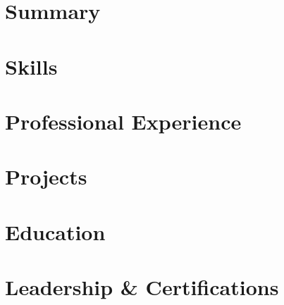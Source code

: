 \documentclass[letter,10pt]{article}
\begin{document}
\pagestyle{empty}
\printheader

\section{Summary}


\section{Skills}


\section{Professional Experience}


\section{Projects}


\section{Education}


\section{Leadership \& Certifications}

\end{document}

